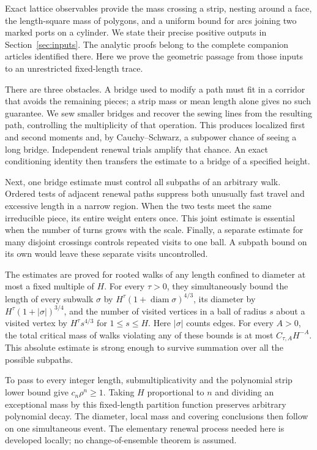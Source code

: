 Exact lattice observables provide the mass crossing a strip, nesting
around a face, the length-square mass of polygons, and a uniform bound
for arcs joining two marked ports on a cylinder. We state their precise
positive outputs in Section~\ref{sec:inputs}. The analytic proofs belong
to the complete companion articles identified there. Here we prove the
geometric passage from those inputs to an unrestricted fixed-length trace.

There are three obstacles. A bridge used to modify a path must fit in a
corridor that avoids the remaining pieces; a strip mass or mean length
alone gives no such guarantee. We sew smaller bridges and recover the
sewing lines from the resulting path, controlling the multiplicity of
that operation. This produces localized first and second moments and,
by Cauchy--Schwarz, a subpower chance of seeing a long bridge. Independent
renewal trials amplify that chance. An exact conditioning identity then
transfers the estimate to a bridge of a specified height.

Next, one bridge estimate must control all subpaths of an arbitrary
walk. Ordered tests of adjacent renewal paths suppress both unusually
fast travel and excessive length in a narrow region. When the two tests
meet the same irreducible piece, its entire weight enters once. This
joint estimate is essential when the number of turns grows with the
scale. Finally, a separate estimate for many disjoint crossings controls
repeated visits to one ball. A subpath bound on its own would leave these
separate visits uncontrolled.

The estimates are proved for rooted walks of any length confined to
diameter at most a fixed multiple of \(H\). For every \(\tau>0\),
they simultaneously bound the length of every subwalk \(\sigma\) by
\(H^\tau(1+\operatorname{diam}\sigma)^{4/3}\), its diameter by
\(H^\tau(1+|\sigma|)^{3/4}\), and the number of visited vertices
in a ball of radius \(s\) about a visited vertex by \(H^\tau s^{4/3}\)
for \(1\le s\le H\). Here \(|\sigma|\) counts edges. For every
\(A>0\), the total critical mass of walks violating any of these
bounds is at most \(C_{\tau,A}H^{-A}\). This absolute estimate is
strong enough to survive summation over all the possible subpaths.

To pass to every integer length, submultiplicativity and the polynomial
strip lower bound give \(c_n\rho^n\ge1\). Taking \(H\) proportional
to \(n\) and dividing an exceptional mass by this fixed-length
partition function preserves arbitrary polynomial decay. The diameter,
local mass and covering conclusions then follow on one simultaneous event.
The elementary renewal process needed here is developed locally; no
change-of-ensemble theorem is assumed.

